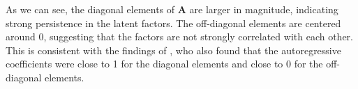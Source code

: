 As we can see, the diagonal elements of $\mathbf{A}$ are larger in magnitude, indicating strong persistence in the latent factors. The off-diagonal elements are centered around 0, suggesting that the factors are not strongly correlated with each other. This is consistent with the findings of \citet{diebold2006macroeconomy}, who also found that the autoregressive coefficients were close to 1 for the diagonal elements and close to 0 for the off-diagonal elements.